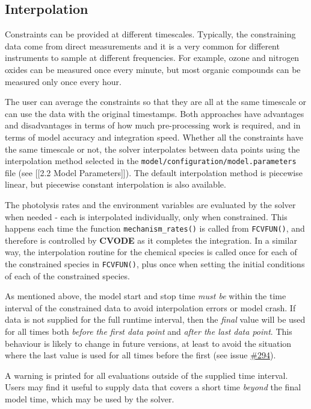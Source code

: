 \hypertarget{interpolation}{%
\subsection{Interpolation}\label{interpolation}}

Constraints can be provided at different timescales. Typically, the
constraining data come from direct measurements and it is a very common
for different instruments to sample at different frequencies. For
example, ozone and nitrogen oxides can be measured once every minute,
but most organic compounds can be measured only once every hour.

The user can average the constraints so that they are all at the same
timescale or can use the data with the original timestamps. Both
approaches have advantages and disadvantages in terms of how much
pre-processing work is required, and in terms of model accuracy and
integration speed. Whether all the constraints have the same timescale
or not, the solver interpolates between data points using the
interpolation method selected in the
\texttt{model/configuration/model.parameters} file (see {[}{[}2.2 Model
Parameters{]}{]}). The default interpolation method is piecewise linear,
but piecewise constant interpolation is also available.

The photolysis rates and the environment variables are evaluated by the
solver when needed - each is interpolated individually, only when
constrained. This happens each time the function
\texttt{mechanism\_rates()} is called from \texttt{FCVFUN()}, and
therefore is controlled by \textbf{CVODE} as it completes the
integration. In a similar way, the interpolation routine for the
chemical species is called once for each of the constrained species in
\texttt{FCVFUN()}, plus once when setting the initial conditions of each
of the constrained species.

As mentioned above, the model start and stop time \emph{must be} within
the time interval of the constrained data to avoid interpolation errors
or model crash. If data is not supplied for the full runtime interval,
then the \emph{final} value will be used for all times both \emph{before
the first data point} and \emph{after the last data point}. This
behaviour is likely to change in future versions, at least to avoid the
situation where the last value is used for all times before the first
(see issue \href{https://github.com/AtChem/AtChem2/issues/294}{\#294}).

A warning is printed for all evaluations outside of the supplied time
interval. Users may find it useful to supply data that covers a short
time \emph{beyond} the final model time, which may be used by the
solver.
